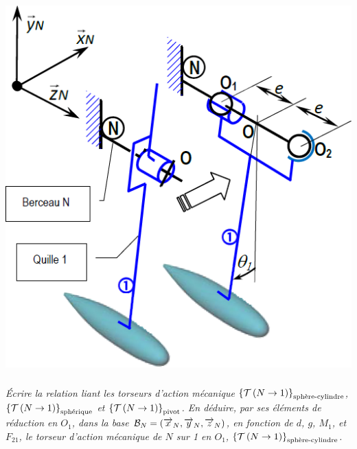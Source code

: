 \documentclass[10pt,fleqn]{article} %
\begin{document}
\begin{multicols}{2}
\begin{center}
\includegraphics[width=\linewidth]{images/fig_05}
\end{center}

\subparagraph{}\textit{Écrire la relation liant les torseurs d’action mécanique $\left\{\mathcal{T} \left(N\rightarrow 1 \right) \right\}_{\text{sphère-cylindre}}$, $\left\{\mathcal{T} \left(N\rightarrow 1 \right) \right\}_{\text{sphérique}}$ et $\left\{\mathcal{T} \left(N\rightarrow 1 \right) \right\}_{\text{pivot}}$.
En déduire, par ses éléments de réduction en $O_1$, dans la
base $\mathcal{B}_N=\left(\overrightarrow{x}_N , \overrightarrow{y}_N , \overrightarrow{z}_N \right)$, en fonction de $d$, $g$, $M_1$, et $F_{21}$, le torseur d’action mécanique de $N$ sur 1 en $O_1$, $\left\{\mathcal{T} \left(N\rightarrow 1 \right) \right\}_{\text{sphère-cylindre}}$.}
\ifprof
\begin{corrige}
\end{corrige}
\else
\fi



\end{multicols}
\end{document}
